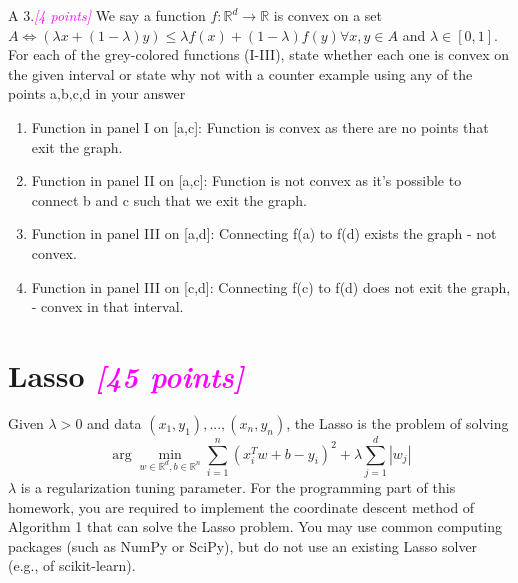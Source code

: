 \documentclass{article}
\newcommand{\argmin}{\arg\!\min}
\newcommand{\field}[1]{\mathbb{#1}}
\newcommand{\1}{\mathbf{1}}
\newcommand{\R}{\field{R}} %
\newcommand{\points}[1]{\small\textcolor{magenta}{\emph{[#1 points]}} \normalsize}
\begin{document}
\vskip 2cm
A 3.\points{4} We say a function $f:\R^d\rightarrow\R$ is convex on a set $A \iff (\lambda x + (1-\lambda)y)\leq \lambda f(x) + (1-\lambda)f(y) \forall x,y \in A$ and $\lambda\in [0,1]$. For each of the grey-colored functions (I-III), state whether each one is convex on the given interval or state why not with a counter example using any of the points a,b,c,d in your answer

\begin{enumerate}
    \item Function in panel I on [a,c]: Function is convex as there are no points that exit the graph.
    \item Function in panel II on [a,c]: Function is not convex as it's possible to connect b and c such that we exit the graph.
    \item Function in panel III on [a,d]: Connecting f(a) to f(d) exists the graph - not convex.
    \item Function in panel III on [c,d]: Connecting f(c) to f(d) does not exit the graph, - convex in that interval.
\end{enumerate}{}




\newpage 
\section*{Lasso \points{45}}
Given $\lambda > 0$ and data $(x_1,y_1),...,(x_n,y_n)$, the Lasso is the problem of solving 
$$\argmin_{w\in\R^d,b\in\R^n} \sum_{i=1}^n (x^T_i w + b - y_i)^2 + \lambda\sum^d_{j=1}|w_j|$$
$\lambda$ is a regularization tuning parameter. For the programming part of this homework, you are required to implement the coordinate descent method of Algorithm 1 that can solve the Lasso problem. You may use common computing packages (such as NumPy or SciPy), but do not use an existing Lasso solver (e.g., of scikit-learn). 
\end{document}

